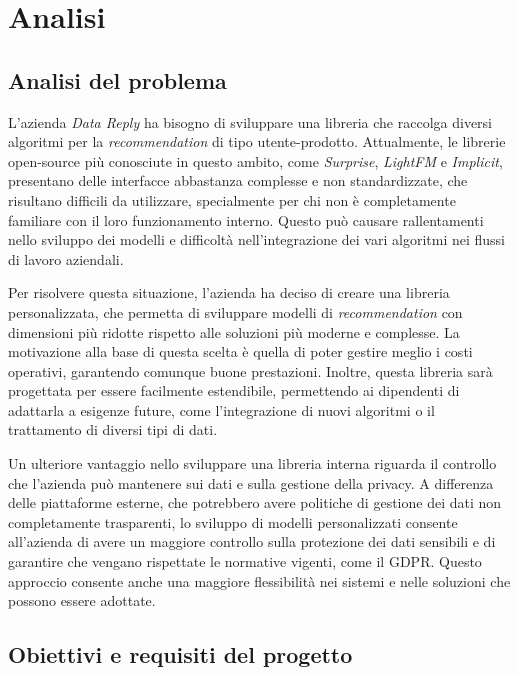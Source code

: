 \chapter{Analisi}

\section{Analisi del problema}

L'azienda \textit{Data Reply} ha bisogno di sviluppare una libreria che raccolga diversi algoritmi per la \textit{recommendation} di tipo utente-prodotto. Attualmente, le librerie open-source più conosciute in questo ambito, come \textit{Surprise}, \textit{LightFM} e \textit{Implicit}, presentano delle interfacce abbastanza complesse e non standardizzate, che risultano difficili da utilizzare, specialmente per chi non è completamente familiare con il loro funzionamento interno. Questo può causare rallentamenti nello sviluppo dei modelli e difficoltà nell’integrazione dei vari algoritmi nei flussi di lavoro aziendali.

Per risolvere questa situazione, l'azienda ha deciso di creare una libreria personalizzata, che permetta di sviluppare modelli di \textit{recommendation} con dimensioni più ridotte rispetto alle soluzioni più moderne e complesse. La motivazione alla base di questa scelta è quella di poter gestire meglio i costi operativi, garantendo comunque buone prestazioni. Inoltre, questa libreria sarà progettata per essere facilmente estendibile, permettendo ai dipendenti di adattarla a esigenze future, come l'integrazione di nuovi algoritmi o il trattamento di diversi tipi di dati.

Un ulteriore vantaggio nello sviluppare una libreria interna riguarda il controllo che l'azienda può mantenere sui dati e sulla gestione della privacy. A differenza delle piattaforme esterne, che potrebbero avere politiche di gestione dei dati non completamente trasparenti, lo sviluppo di modelli personalizzati consente all'azienda di avere un maggiore controllo sulla protezione dei dati sensibili e di garantire che vengano rispettate le normative vigenti, come il GDPR. Questo approccio consente anche una maggiore flessibilità nei sistemi e nelle soluzioni che possono essere adottate.

\section{Obiettivi e requisiti del progetto}

